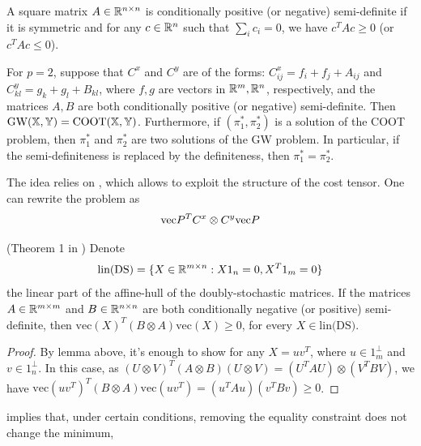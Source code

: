 \begin{definition}
   A square matrix $A \in \mathbb R^{n \times n}$ is
  conditionally positive (or negative) semi-definite
  if it is symmetric and for any $c \in \mathbb R^n$ such that $\sum_i c_i = 0$, we have
  $c^T A c \geq 0$ (or $c^T A c \leq 0$).
\end{definition}
\begin{proposition}
  \label{prop:coot_gw_equiv}
  For $p=2$, suppose that $C^x$ and $C^y$ are of the forms:
  $C^x_{ij} = f_i + f_j + A_{ij}$ and $C^y_{kl} = g_k + g_l + B_{kl}$,
  where $f, g$ are vectors in $\mathbb R^m, \mathbb R^n$, respectively,
  and the matrices $A, B$ are both conditionally positive (or negative) semi-definite.
  Then $\text{GW}(\mathbb X, \mathbb Y) = \text{COOT}(\mathbb X, \mathbb Y)$.
  Furthermore, if $(\pi_1^*, \pi_2^*)$ is a solution of the COOT problem, then $\pi_1^*$ and $\pi_2^*$
  are two solutions of the GW problem. In particular,
  if the semi-definiteness is replaced by the definiteness, then $\pi_1^* = \pi_2^*$.
\end{proposition}
The idea relies on \citep{Maron18}, which allows to exploit the structure of the cost tensor.
One can rewrite the problem as
\begin{align}
  \text{vec}{P}^T C^x \otimes C^y \text{vec}{P}
\end{align}
\begin{proposition}
  (Theorem 1 in \citep{Maron18}) Denote
\begin{equation}
    \text{lin(DS)} = \{X \in \mathbb R^{m \times n}: X 1_n = 0, X^T 1_m = 0 \}
\end{equation}
the linear part of the affine-hull of the doubly-stochastic matrices. If the matrices $A \in \mathbb R^{m \times m}$ and
  $B \in \mathbb R^{n \times n}$ are both conditionally negative (or positive) semi-definite, then $\text{vec}(X)^T (B \otimes A) \text{vec}(X) \geq 0$, for every $X \in \text{lin(DS)}$.
\end{proposition}
\begin{proof}
    By lemma above, it's enough to show for any $X = u v^T$, where $u \in 1^{\perp}_m$
    and $v \in 1^{\perp}_n$. In this case, as
    $(U \otimes V)^T (A \otimes B) (U \otimes V) = (U^T A U) \otimes (V^T B V)$, we have
    $\text{vec}(u v^T)^T (B \otimes A) \text{vec}(u v^T) = (u^T A u) (v^T B v) \geq 0$.
\end{proof}
 implies that, under certain conditions, removing
the equality constraint does not change the minimum,
